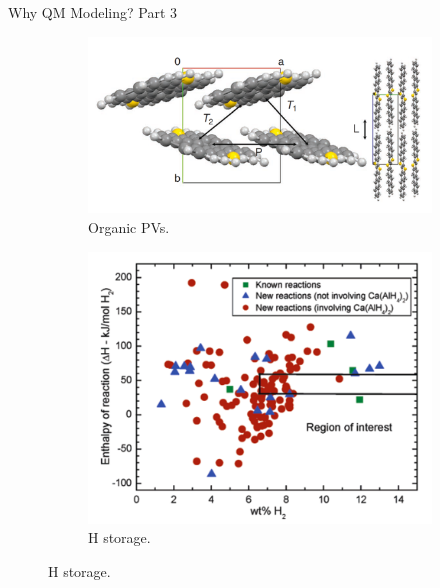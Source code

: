 \documentclass[aspectratio=169]{beamer}
\begin{document}
\begin{frame}{Why QM Modeling? Part 3}
\begin{figure}
\begin{subfigure}{0.23\linewidth}
            \end{subfigure}
            \begin{subfigure}{0.23\linewidth}
                \includegraphics[width=\linewidth]{lectures/figures/0.5_Organic_PVs.png}
                \caption{Organic PVs\cite{sokolovComputationalDiscoveryExperimental2011}.}
            \end{subfigure}
            \begin{subfigure}{0.23\linewidth}
                \includegraphics[width=\linewidth]{lectures/figures/0.5_H_storage.png}
                \caption{H storage\cite{alapatiLargeScaleScreeningMetal2008}.}
            \end{subfigure}
        \end{figure}
    \end{frame}
\end{document}
